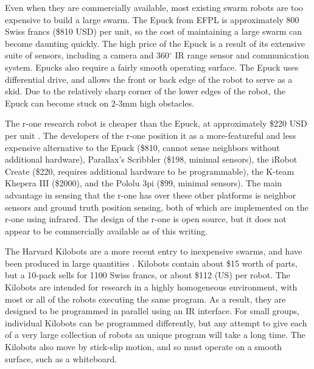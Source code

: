 \documentclass[]{article}
\begin{document}
Even when they are commercially available, most existing swarm robots are too expensive to build a large swarm.
The Epuck from EFPL is approximately 800 Swiss francs (\$810 USD) per unit, so the cost of maintaining a large swarm can become daunting quickly. 
The high price of the Epuck is a result of its extensive suite of sensors, including a camera and 360$^{\circ}$ IR range sensor and communication system. 
Epucks also require a fairly smooth operating surface.
The Epuck uses differential drive, and allows the front or back edge of the robot to serve as a skid. 
Due to the relatively sharp corner of the lower edges of the robot, the Epuck can become stuck on 2-3mm high obstacles. 

The r-one research robot is cheaper than the Epuck, at approximately \$220 USD per unit \cite{mclurkin2013low}. 
The developers of the r-one position it as a more-featureful and less expensive alternative to the Epuck (\$810, cannot sense neighbors without additional hardware), Parallax's Scribbler (\$198, minimal sensors), the iRobot Create (\$220, requires additional hardware to be programmable), the K-team Khepera III (\$2000), and the Pololu 3pi (\$99, minimal sensors). The main advantage in sensing that the r-one has over these other platforms is neighbor sensors and ground truth position sensing, both of which are implemented on the r-one using infrared.
The design of the r-one is open source, but it does not appear to be commercially available as of this writing.   

The Harvard Kilobots are a more recent entry to inexpensive swarms, and have been produced in large quantities \cite{rubenstein2014kilobot}. 
Kilobots contain about \$15 worth of parts, but a 10-pack sells for 1100 Swiss francs, or about \$112 (US) per robot. 
The Kilobots are intended for research in a highly homogeneous environment, with most or all of the robots executing the same program. 
As a result, they are designed to be programmed in parallel using an IR interface. 
For small groups, individual Kilobots can be programmed differently, but any attempt to give each of a very large collection of robots an unique program will take a long time. 
The Kilobots also move by stick-slip motion, and so must operate on a smooth surface, such as a whiteboard. 
\end{document}
